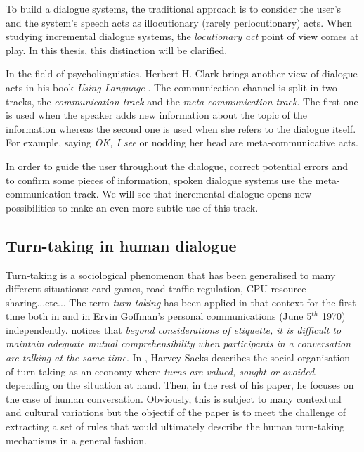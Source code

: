 			To build a dialogue systems, the traditional approach is to consider the user's and the system's speech acts as illocutionary (rarely perlocutionary) acts. When studying incremental dialogue systems, the \textit{locutionary act} point of view comes at play. In this thesis, this distinction will be clarified.
			
			In the field of psycholinguistics, Herbert H. Clark brings another view of dialogue acts in his book \textit{Using Language} \cite{Clark1996}. The communication channel is split in two tracks, the \textit{communication track} and the \textit{meta-communication track}. The first one is used when the speaker adds new information about the topic of the information whereas the second one is used when she refers to the dialogue itself. For example, saying \textit{OK, I see} or nodding her head are meta-communicative acts. 
        
			In order to guide the user throughout the dialogue, correct potential errors and to confirm some pieces of information, spoken dialogue systems use the meta-communication track. We will see that incremental dialogue opens new possibilities to make an even more subtle use of this track.
        
    \subsection{Turn-taking in human dialogue}
    \label{soa:ttphuman}
    
    	Turn-taking is a sociological phenomenon that has been generalised to many different situations: card games, road traffic regulation, CPU resource sharing...etc... The term \textit{turn-taking} has been applied in that context for the first time both in \cite{Yngve1970} and in Ervin Goffman's personal communications (June 5$^{th}$ 1970) independently. \cite{Duncan1972} notices that \textit{beyond considerations of etiquette, it is difficult to maintain adequate mutual comprehensibility when participants in a conversation are talking at the same time}. In \cite{Sacks1974}, Harvey Sacks describes the social organisation of turn-taking as an economy where \textit{turns are valued, sought or avoided}, depending on the situation at hand. Then, in the rest of his paper, he focuses on the case of human conversation. Obviously, this is subject to many contextual and cultural variations but the objectif of the paper is to meet the challenge of extracting a set of rules that would ultimately describe the human turn-taking mechanisms in a general fashion.
        
